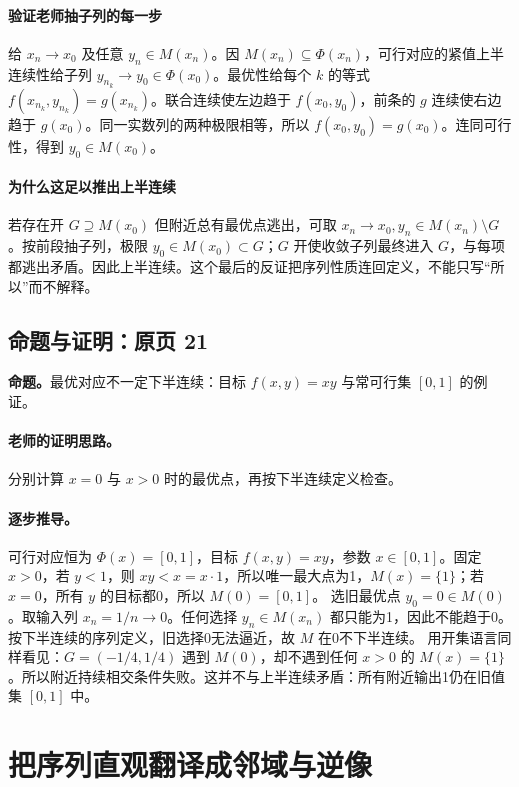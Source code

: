 \paragraph{验证老师抽子列的每一步}给 $x_n\to x_0$ 及任意 $y_n\in M(x_n)$。因 $M(x_n)\subseteq\Phi(x_n)$，可行对应的紧值上半连续性给子列 $y_{n_k}\to y_0\in\Phi(x_0)$。最优性给每个 $k$ 的等式 $f(x_{n_k},y_{n_k})=g(x_{n_k})$。联合连续使左边趋于 $f(x_0,y_0)$，前条的 $g$ 连续使右边趋于 $g(x_0)$。同一实数列的两种极限相等，所以 $f(x_0,y_0)=g(x_0)$。连同可行性，得到 $y_0\in M(x_0)$。
\paragraph{为什么这足以推出上半连续}若存在开 $G\supseteq M(x_0)$ 但附近总有最优点逃出，可取 $x_n\to x_0,y_n\in M(x_n)\setminus G$。按前段抽子列，极限 $y_0\in M(x_0)\subset G$；$G$ 开使收敛子列最终进入 $G$，与每项都逃出矛盾。因此上半连续。这个最后的反证把序列性质连回定义，不能只写“所以”而不解释。


\subsection{命题与证明：原页 21}

\textbf{命题。}最优对应不一定下半连续：目标 $f(x,y)=xy$ 与常可行集 $[0,1]$ 的例证。

\paragraph{老师的证明思路。}分别计算 $x=0$ 与 $x>0$ 时的最优点，再按下半连续定义检查。

\paragraph{逐步推导。}
可行对应恒为 $\Phi(x)=[0,1]$，目标 $f(x,y)=xy$，参数 $x\in[0,1]$。固定 $x>0$，若 $y<1$，则 $xy<x=x\cdot1$，所以唯一最大点为1，$M(x)=\{1\}$；若 $x=0$，所有 $y$ 的目标都0，所以 $M(0)=[0,1]$。
选旧最优点 $y_0=0\in M(0)$。取输入列 $x_n=1/n\to0$。任何选择 $y_n\in M(x_n)$ 都只能为1，因此不能趋于0。按下半连续的序列定义，旧选择0无法逼近，故 $M$ 在0不下半连续。
用开集语言同样看见：$G=(-1/4,1/4)$ 遇到 $M(0)$，却不遇到任何 $x>0$ 的 $M(x)=\{1\}$。所以附近持续相交条件失败。这并不与上半连续矛盾：所有附近输出1仍在旧值集 $[0,1]$ 中。


\clearpage\section{把序列直观翻译成邻域与逆像}\label{g:108:23}


